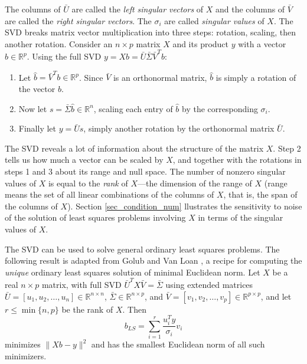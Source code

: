 \documentclass[12pt,hidelinks]{article}
\numberwithin{equation}{section}
\begin{document}
The columns of $\bar{U}$ are called the {\it left singular vectors} of $X$ and
the columns of $\bar{V}$ are called the {\it right singular vectors}.  The
$\sigma_i$ are called {\it singular values} of $X$.  The SVD breaks matrix
vector multiplication into three steps: rotation, scaling, then another
rotation.  Consider an $n\times p$ matrix $X$ and its product $y$ with a vector
$b\in\mathbb{R}^p$. Using the full SVD $y=Xb = \bar{U}\bar{\Sigma}\bar{V}^Tb$:
\begin{enumerate}
\item Let $\hat{b}=\bar{V}^T b\in\mathbb{R}^p$.
Since $\bar{V}$ is an orthonormal matrix, $\hat{b}$ is simply a rotation of the
vector $b$.
\item Now let $s = \bar{\Sigma}\hat{b}\in\mathbb{R}^n$,
scaling each entry of $\hat{b}$ by the corresponding $\sigma_i$.
\item Finally let $y=\bar{U}s$, simply another rotation by the
orthonormal matrix $\bar{U}$.
\end{enumerate}
The SVD reveals a lot of information about the structure of the matrix $X$.
Step 2 tells us how much a vector can be scaled by $X$, and together with
the rotations in steps
1 and 3 about its range and null space.  The number of nonzero singular
values of $X$ is equal to the \emph{rank} of $X$---the dimension of the range of
$X$ (range means the set of all linear combinations of the columns of $X$, that is,
the span of the columns of $X$). Section \ref{sec_condition_num}
llustrates the sensitivity to noise of the solution of least squares problems
involving $X$ in terms of the singular values of $X$.

The SVD can be used to solve general ordinary least squares
problems. The following result is adapted from Golub and Van Loan \cite[Theorem
5.5.1]{golub2012matrix}, a recipe for computing the {\it unique} ordinary least
squares solution of minimal Euclidean norm.
Let $X$ be a real $n\times p$ matrix, with full SVD
$\bar{U}^TX\bar{V} = \bar{\Sigma}$ using extended matrices
$\bar{U} = [u_1, u_2, \ldots, u_n] \in\mathbb{R}^{n\times n}$,
$\bar{\Sigma}\in\mathbb{R}^{n\times p}$, and
$\bar{V} = [v_1, v_2, \ldots, v_p]\in\mathbb{R}^{p\times p}$,
and let $r \le \min\{n, p\}$ be the rank of $X$. Then
\begin{equation}\label{SVDLS}
b_{LS} = \sum_{i=1}^r \frac{u_i^T y}{\sigma_i}v_i
\end{equation}
minimizes $\|X b - y\|^2$ and has the smallest Euclidean norm of all
such minimizers.
\end{document}
